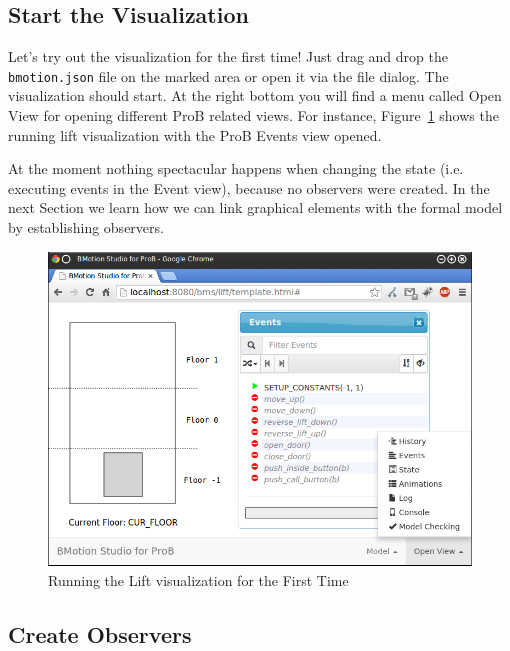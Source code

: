 \subsection{Start the Visualization}
\label{sec:stat_vis}

Let's try out the visualization for the first time!
Just drag and drop the \texttt{bmotion.json} file on the marked area or open it via the file dialog.
The visualization should start.
At the right bottom you will find a menu called \textsf{Open View} for opening different ProB related views.
For instance, Figure~\ref{fig_tut_03_running1} shows the running lift visualization with the ProB Events view opened.

At the moment nothing spectacular happens when changing the state (i.e. executing events in the Event view), because no observers were created.
In the next Section we learn how we can link graphical elements with the formal model by establishing observers.

\begin{figure}[!ht]
\begin{center}
	\includegraphics[width=12cm]{img/tutorial/tut_03.png}
	\caption{Running the Lift visualization for the First Time}
	\label{fig_tut_03_running1}
\end{center}
\end{figure}

\subsection{Create Observers}
\label{sec_creation_observers}

